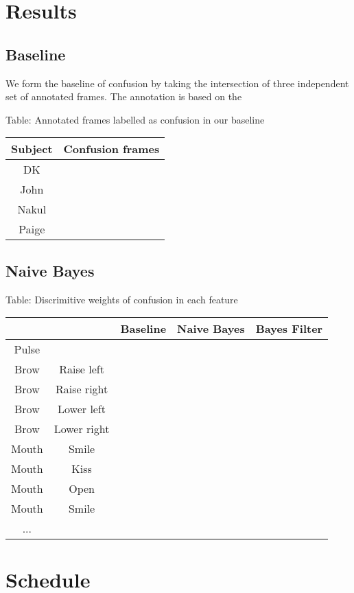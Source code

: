 \documentclass[12pt,letterpaper]{article}
\begin{document}
\section{Results}
\subsection{Baseline}
We form the baseline of confusion by taking the intersection of three independent set of annotated frames. The annotation is based on the 

\begin{center} Table: Annotated frames labelled as confusion in our baseline

\begin{tabular}{ c | c }
Subject & Confusion frames \\ \hline
DK &  \\ \hline
John & \\ \hline
Nakul &  \\ \hline
Paige &  \\ 
\end{tabular}
\end{center}

\subsection{Naive Bayes}
\begin{center} Table: Discrimitive weights of confusion in each feature

\begin{tabular}{ c | c | c | c | c }
 & & Baseline & Naive Bayes & Bayes Filter\\ \hline
Pulse &  &  &  & \\ \hline
Brow & Raise left  &  &  & \\ \hline
Brow & Raise right  &  &  & \\ \hline
Brow & Lower left  &  &  & \\ \hline
Brow & Lower right  &  &  & \\ \hline
Mouth & Smile  &  &  & \\ \hline
Mouth & Kiss  &  &  & \\ \hline
Mouth & Open  &  &  & \\ \hline
Mouth & Smile  &  &  & \\ \hline
... &   &  &  & \\ 
\end{tabular}
\end{center}


\section{Schedule}
\end{document}
